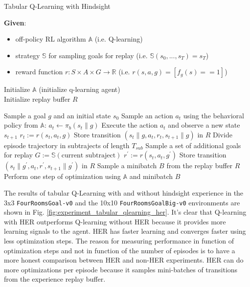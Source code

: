 \documentclass[conference]{IEEEtran}
\begin{document}
\begin{algorithm}
\caption{Tabular Q-Learning with Hindsight}
\label{alg:qtab_her}
\textbf{Given}:
\begin{itemize}
    \item off-policy RL algorithm $\mathbb{A}$ (i.e. Q-learning)
    \item strategy $\mathbb{S}$ for sampling goals for replay (i.e. $\mathbb{S}(s_0, ..., s_T ) = s_T$)
    \item reward function $r: S \times A \times G \to \mathbb{R}$ (i.e. $r(s, a, g) = [f_g(s) == 1]$)
\end{itemize}
Initialize $\mathbb{A}$ (initialize q-learning agent) \\
Initialize replay buffer $R$
\begin{algorithmic}
    \STATE Sample a goal $g$ and an initial state $s_0$
        \STATE Sample an action $a_t$ using the behavioral policy from $\mathbb{A}$: 
        \STATE \text{ }\text{ }\text{ }\text{ }$a_t \leftarrow \pi_b(s_{t}\|g)$
        \STATE Execute the action $a_t$ and observe a new state $s_{t+1}$
        \STATE $r_t := r(s_t,a_t,g)$
        \STATE Store transition $(s_t\|g, a_t, r_t, s_{t+1}\|g)$ in $R$
    \ENDFOR
    \STATE Divide episode trajectory in subtrajects of length $T_{sub}$
            \STATE Sample a set of additional goals for replay $G:=\mathbb{S}(\text{current subtraject})$
                \STATE $r^{\prime} := r(s_t,a_t,g^{\prime})$
                \STATE Store transition $(s_t\|g^{\prime}, a_t, r^{\prime}, s_{t+1}\|g^{\prime})$ in $R$
            \ENDFOR
        \ENDFOR
    \ENDFOR
        \STATE Sample a minibatch $B$ from the replay buffer $R$
        \STATE Perform one step of optimization using $\mathbb{A}$ and minibatch $B$
    \ENDFOR
\ENDFOR
\end{algorithmic}
\end{algorithm}

The results of tabular Q-Learning with and without hindsight experience in the 3x3 \texttt{FourRoomsGoal-v0} and the 10x10 \texttt{FourRoomsGoalBig-v0} environments are shown in Fig. \ref{fig:experiment_tabular_qlearning_her}. It's clear that Q-learning with HER outperforms Q-learning without HER because it provides more learning signals to the agent. HER has faster learning and converges faster using less optimization steps. The reason for measuring performance in function of optimization steps and not in function of the number of episodes is to have a more honest comparison between HER and non-HER experiments. HER can do more optimizations per episode because it samples mini-batches of transitions from the experience replay buffer.
\end{document}
